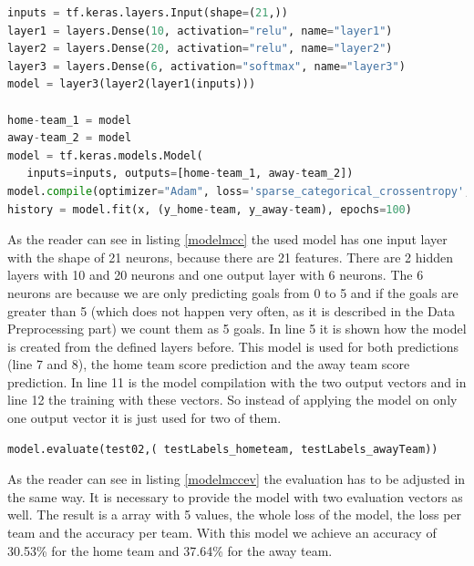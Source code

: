 \begin{lstlisting}[language=Python, caption=Python code for multi class classification, label=modelmcc]
inputs = tf.keras.layers.Input(shape=(21,))
layer1 = layers.Dense(10, activation="relu", name="layer1")
layer2 = layers.Dense(20, activation="relu", name="layer2")
layer3 = layers.Dense(6, activation="softmax", name="layer3")
model = layer3(layer2(layer1(inputs)))

home-team_1 = model
away-team_2 = model
model = tf.keras.models.Model(
   inputs=inputs, outputs=[home-team_1, away-team_2])
model.compile(optimizer="Adam", loss='sparse_categorical_crossentropy', metrics=[ "acc"])
history = model.fit(x, (y_home-team, y_away-team), epochs=100)
\end{lstlisting}

As the reader can see in listing \ref{modelmcc} the used model has one input layer with the shape of 21 neurons, because there are 21 features. There are 2 hidden layers with 10 and 20 neurons and one output layer with 6 neurons. The 6 neurons are because we are only predicting goals from 0 to 5 and if the goals are greater than 5 (which does not happen very often, as it is described in the Data Preprocessing part) we count them as 5 goals. In line 5 it is shown how the model is created from the defined layers before. This model is used for both predictions (line 7 and 8), the home team score prediction and the away team score prediction. In line 11 is the model compilation with the two output vectors and in line 12 the training with these vectors. So instead of applying the model on only one output vector it is just used for two of them. 

\begin{lstlisting}[language=Python, caption=Python code for multi class classification model evaluation, label=modelmccev]
model.evaluate(test02,( testLabels_hometeam, testLabels_awayTeam))
\end{lstlisting}

As the reader can see in listing \ref{modelmccev} the evaluation has to be adjusted in the same way. It is necessary to provide the model with two evaluation vectors as well. The result is a array with 5 values, the whole loss of the model, the loss per team and the accuracy per team. With this model we achieve an accuracy of 30.53\% for the home team and 37.64\% for the away team. 

